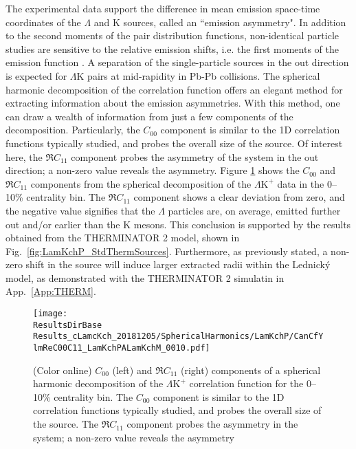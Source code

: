 \documentclass[ALICE,manyauthors]{cernphprep}
\newcommand{\ResultsDirBase}{/home/jesse/Analysis/FemtoAnalysis/Results/}
\newcommand{\Lam}{$\Lambda$\xspace}
\newcommand{\LamK}{$\Lambda$K\xspace}
\newcommand{\LamKchP}{$\Lambda\mathrm{K^{+}}$\xspace}
\begin{document}
The experimental data support the difference in mean emission space-time coordinates of the \Lam and K sources, called an ``emission asymmetry".
In addition to the second moments of the pair distribution functions, non-identical particle studies are sensitive to the relative emission shifts, i.e. the first moments of the emission function \cite{Kisiel:2009eh}.
A separation of the single-particle sources in the out direction is expected for \LamK pairs at mid-rapidity in Pb-Pb collisions.
The spherical harmonic decomposition of the correlation function offers an elegant method for extracting information about the emission asymmetries.
With this method, one can draw a wealth of information from just a few components of the decomposition.
Particularly, the $C_{00}$ component is similar to the 1D correlation functions typically studied, and probes the overall size of the source.
Of interest here, the $\Re C_{11}$ component probes the asymmetry of the system in the out direction; a non-zero value reveals the asymmetry. 
Figure \ref{fig:LamKchP_ReC00C11_0010} shows the $C_{00}$ and $\Re C_{11}$ components from the spherical decomposition of the \LamKchP data in the 0--10\% centrality bin.
The $\Re C_{11}$ component shows a clear deviation from zero, and the negative value signifies that the \Lam particles are, on average, emitted further out and/or earlier than the K mesons.
This conclusion is supported by the results obtained from the THERMINATOR 2 model, shown in Fig.\ \ref{fig:LamKchP_StdThermSources}.
Furthermore, as previously stated, a non-zero shift in the source will induce larger extracted radii within the Lednick\'y model, as demonstrated with the THERMINATOR 2 simulatin in App.\ \ref{App:THERM}.

\begin{figure}[h!]
  \centering
  \texttt{[image: \\ResultsDirBase Results\_cLamcKch\_20181205/SphericalHarmonics/LamKchP/CanCfYlmReC00C11\_LamKchPALamKchM\_0010.pdf]}
  \caption[\LamKchP $C_{00}$ and $\Re C_{11}$ Spherical Harmonic Components (0--10\%)]
  {
  (Color online) $C_{00}$ (left) and $\Re C_{11}$ (right) components of a spherical harmonic decomposition of the \LamKchP correlation function for the 0--10\% centrality bin.  
The $C_{00}$ component is similar to the 1D correlation functions typically studied, and probes the overall size of the source.
The $\Re C_{11}$ component probes the asymmetry in the system; a non-zero value reveals the asymmetry
  }
  \label{fig:LamKchP_ReC00C11_0010}
\end{figure}
\end{document}
